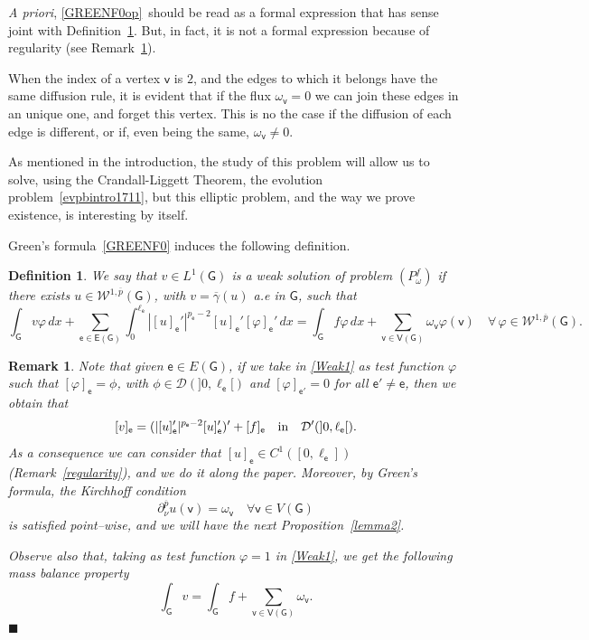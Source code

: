 \documentclass[reqno,12pt]{amsart}
\newtheorem{definition}[theorem]{Definition}
\newtheorem{remark}[theorem]{Remark}
\def\e{\mathsf{e}} 	%
\def\v{\mathsf{v}}	%
\newcommand{\G}{\mathsf{G}}	%
\newcommand{\V}{\mathsf{V}}	%
\newcommand{\E}{\mathsf{E}}	%
\numberwithin{equation}{section} %
\begin{document}
{\it A priori}, \eqref{GREENF0op}~should be read as a formal expression that has sense joint with Definition~\ref{ladeg1834dom}. But, in fact, it is not a formal expression because of regularity (see Remark~\ref{KirchTrue}).

 

  When the index of a vertex $\v$ is $2$, and the edges to which it belongs have the same diffusion rule, it is evident that if the flux $\omega_\v=0$ we can join these edges in an unique one, and forget this vertex. This is no the case if the diffusion of each edge is different, or if, even being the same, $\omega_\v\neq0$.

 As mentioned in the introduction, the study of this  problem  will allow us to solve, using the Crandall-Liggett Theorem, the evolution problem~\eqref{evpbintro1711}, but this elliptic problem, and the way we prove existence, is interesting by itself.
 
 
 Green's formula~\eqref{GREENF0} induces the following definition.
 

\begin{definition}\label{ladeg1834dom}\rm We say that $v\in L^{1}(\G)$ is a {\it weak solution} of problem $(P_{\omega}^f)$ if  there exists $u\in \mathcal{W}^{1,\overline{p}}(\G)$, with $v= \overline{\gamma}(u)$ a.e in $\G$, such that
\begin{equation}\label{Weak1}  \int_\G v\varphi\, dx+ \sum_{\e \in\E(\G)}\int_{0}^{\ell_\e}|[u]_\e'|^{p_\e-2}[u]_\e' [\varphi]_\e'\,   dx= \int_\G f \varphi \,dx + \sum_{\v\in \V(\G)}\omega_\v\varphi(\v) \quad \forall \, \varphi \in \mathcal{W}^{1,\overline{p}}(\G). \end{equation}
\end{definition}
 


 \begin{remark}\label{KirchTrue} \rm   Note that given $\e \in E(\G)$, if we take in \eqref{Weak1} as test function $\varphi$ such that $[\varphi]_\e = \phi$, with $\phi \in \mathcal{D}(]0, \ell_\e[)$ and $[\varphi]_{\e'} = 0$ for all $\e' \not= \e$, then we obtain that
\begin{equation}\label{distribu} 
[v]_\e  = (\vert [u]_\e' \vert^{p_\e -2} [u]_\e')' + [f]_\e \quad \hbox{in} \quad \mathcal{D}^{\prime}(]0, \ell_\e[). 
\end{equation}  As a consequence   we can consider  that $[u]_\e\in C^1([0,\ell_\e])$ (Remark~\ref{regularity}), and we do it along the paper.
Moreover, by Green's formula, the  Kirchhoff condition
 $$  \partial^{\overline{p}}_\nu u (\v)=   \omega_\v \quad \forall \v \in V(\G)$$
is   satisfied point--wise, and we will have the next Proposition~\ref{lemma2}.

 Observe also that, taking   as test function $\varphi =1$ in \eqref{Weak1}, we get the following {\it mass balance property}
\begin{equation}\label{MBC1}
\int_\G v = \int_\G f   + \sum_{\v\in \V(\G)}\omega_\v.
\end{equation}
\hfill$\blacksquare$
 \end{remark}
\end{document}
